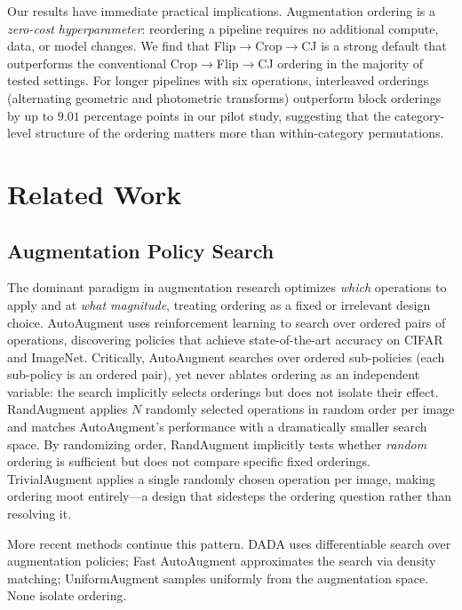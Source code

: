 \documentclass{article}
\begin{document}
Our results have immediate practical implications. Augmentation ordering is a \emph{zero-cost hyperparameter}: reordering a pipeline requires no additional compute, data, or model changes. We find that Flip$\to$Crop$\to$CJ is a strong default that outperforms the conventional Crop$\to$Flip$\to$CJ ordering in the majority of tested settings. For longer pipelines with six operations, interleaved orderings (alternating geometric and photometric transforms) outperform block orderings by up to $9.01$ percentage points in our pilot study, suggesting that the category-level structure of the ordering matters more than within-category permutations.

\section{Related Work}

\subsection{Augmentation Policy Search}

The dominant paradigm in augmentation research optimizes \emph{which} operations to apply and at \emph{what magnitude}, treating ordering as a fixed or irrelevant design choice. AutoAugment \cite{cubuk2019autoaugment} uses reinforcement learning to search over ordered pairs of operations, discovering policies that achieve state-of-the-art accuracy on CIFAR and ImageNet. Critically, AutoAugment searches over ordered sub-policies (each sub-policy is an ordered pair), yet never ablates ordering as an independent variable: the search implicitly selects orderings but does not isolate their effect. RandAugment \cite{cubuk2020randaugment} applies $N$ randomly selected operations in random order per image and matches AutoAugment's performance with a dramatically smaller search space. By randomizing order, RandAugment implicitly tests whether \emph{random} ordering is sufficient but does not compare specific fixed orderings. TrivialAugment \cite{muller2021trivialaugment} applies a single randomly chosen operation per image, making ordering moot entirely---a design that sidesteps the ordering question rather than resolving it.

More recent methods continue this pattern. DADA \cite{li2020dada} uses differentiable search over augmentation policies; Fast AutoAugment \cite{lim2019fast} approximates the search via density matching; UniformAugment \cite{lingchen2020uniformaugment} samples uniformly from the augmentation space. None isolate ordering.
\end{document}
